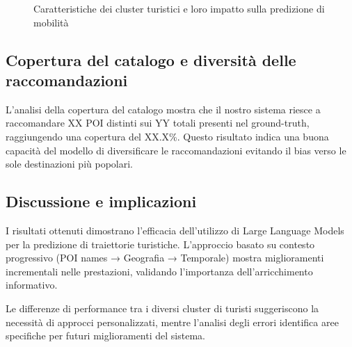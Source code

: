 \begin{figure}[H]
\centering
\caption{Caratteristiche dei cluster turistici e loro impatto sulla predizione di mobilità}
\label{fig:cluster_analysis}
\end{figure}

\subsection{Copertura del catalogo e diversità delle raccomandazioni}

L'analisi della copertura del catalogo mostra che il nostro sistema riesce a raccomandare XX POI distinti sui YY totali presenti nel ground-truth, raggiungendo una copertura del XX.X\%. Questo risultato indica una buona capacità del modello di diversificare le raccomandazioni evitando il bias verso le sole destinazioni più popolari.

\subsection{Discussione e implicazioni}

I risultati ottenuti dimostrano l'efficacia dell'utilizzo di Large Language Models per la predizione di traiettorie turistiche. L'approccio basato su contesto progressivo (POI names → Geografia → Temporale) mostra miglioramenti incrementali nelle prestazioni, validando l'importanza dell'arricchimento informativo.

Le differenze di performance tra i diversi cluster di turisti suggeriscono la necessità di approcci personalizzati, mentre l'analisi degli errori identifica aree specifiche per futuri miglioramenti del sistema.